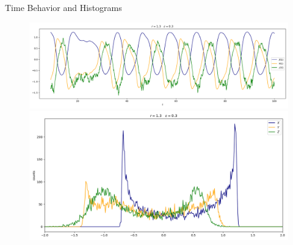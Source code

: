 \documentclass[10pt]{beamer}
\begin{document}
%

\begin{frame}{Time Behavior and Histograms}
	\begin{figure}
		\includegraphics[width=\textwidth, height=0.52\textheight,keepaspectratio]{./figures_2/r1.3-eps0.3-time-trajectories.png}
		\includegraphics[width=\textwidth, height=0.52\textheight,keepaspectratio]{./figures_2/r1.3-eps0.3-hist.png}
	\end{figure}
\end{frame}
\end{document}
